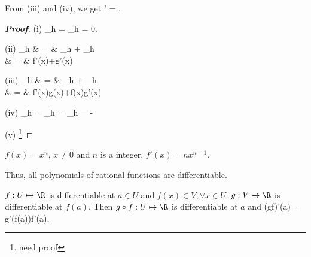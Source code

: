 \begin{remark}
From (iii) and (iv), we get
\be
{}' = .
\ee
\end{remark}

\begin{proof}[{\bf Proof}] \ben
\item [(i)]
\be
\lim_{h} = \lim_{h} = 0.
\ee

\item [(ii)]
\beast
\lim_{h} & = &  \lim_{h} + \lim_{h} \\
& = &  f'(x)+g'(x)
\eeast

\item [(iii)] 
\beast
\lim_{h} & = & \lim_{h} + \lim_{h} \nonumber\\
& = & f'(x)g(x)+f(x)g'(x)
\eeast

\item [(iv)] 
\beast
\lim_{h} = \lim_{h} = \lim_{h} = -
\eeast

\item [(v)] \footnote{need proof}
\een
\end{proof}

\begin{example}
$f(x)=x^n$, $x\neq 0$ and $n$ is a integer, $f'(x) = nx^{n-1}$.

Thus, all polynomials of rational functions are differentiable.
\end{example}

\begin{theorem}\label{thm:chain_rule_real_function}
$f: U\mapsto \R$ is differentiable at $a\in U$ and $f(x)\in V, \forall x\in U$. $g: V\mapsto \R$ is differentiable at $f(a)$. Then $g\circ f: U\mapsto \R$ is differentiable at $a$ and
\be
(g\circ f)'(a) = g'(f(a))f'(a).
\ee
\end{theorem}


